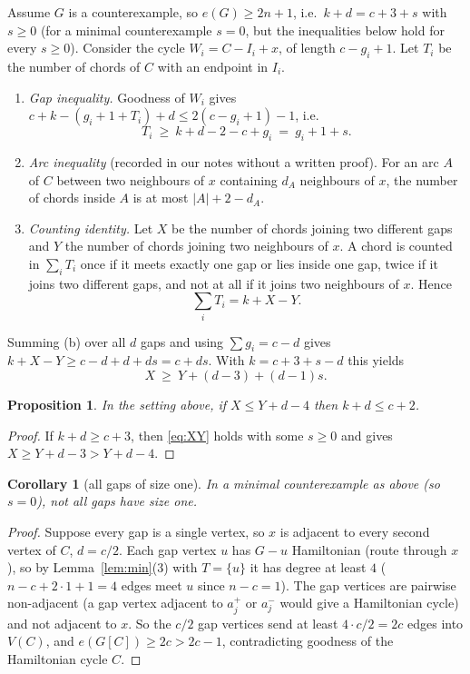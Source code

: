 \documentclass[11pt]{amsart}
\newtheorem{proposition}{Proposition}
\newtheorem{corollary}{Corollary}
\theoremstyle{remark}
\begin{document}
Assume $G$ is a counterexample, so $e(G)\ge 2n+1$, i.e.\ $k+d=c+3+s$ with $s\ge0$ (for a minimal counterexample $s=0$, but the inequalities below hold for every $s\ge0$). Consider the cycle $W_i=C-I_i+x$, of length $c-g_i+1$. Let $T_i$ be the number of chords of $C$ with an endpoint in $I_i$.

\begin{enumerate}
\item[(b)] \emph{Gap inequality.} Goodness of $W_i$ gives $c+k-(g_i+1+T_i)+d\le 2(c-g_i+1)-1$, i.e.
\[
T_i\ \ge\ k+d-2-c+g_i\ =\ g_i+1+s .
\]
\item[(c)] \emph{Arc inequality} (recorded in our notes without a written proof). For an arc $A$ of $C$ between two neighbours of $x$ containing $d_A$ neighbours of $x$, the number of chords inside $A$ is at most $|A|+2-d_A$.
\item[(d)] \emph{Counting identity.} Let $X$ be the number of chords joining two different gaps and $Y$ the number of chords joining two neighbours of $x$. A chord is counted in $\sum_iT_i$ once if it meets exactly one gap or lies inside one gap, twice if it joins two different gaps, and not at all if it joins two neighbours of $x$. Hence
\[
\sum_i T_i=k+X-Y .
\]
\end{enumerate}

Summing (b) over all $d$ gaps and using $\sum g_i=c-d$ gives $k+X-Y\ge c-d+d+ds=c+ds$. With $k=c+3+s-d$ this yields
\begin{equation}\label{eq:XY}
X\ \ge\ Y+(d-3)+(d-1)s .
\end{equation}

\begin{proposition}\label{prop:gaps}
In the setting above, if $X\le Y+d-4$ then $k+d\le c+2$.
\end{proposition}
\begin{proof}
If $k+d\ge c+3$, then \eqref{eq:XY} holds with some $s\ge0$ and gives $X\ge Y+d-3>Y+d-4$.
\end{proof}

\begin{corollary}[all gaps of size one]\label{cor:one}
In a minimal counterexample as above (so $s=0$), not all gaps have size one.
\end{corollary}
\begin{proof}
Suppose every gap is a single vertex, so $x$ is adjacent to every second vertex of $C$, $d=c/2$. Each gap vertex $u$ has $G-u$ Hamiltonian (route through $x$), so by Lemma~\ref{lem:min}(3) with $T=\{u\}$ it has degree at least $4$ ($n-c+2\cdot 1+1=4$ edges meet $u$ since $n-c=1$). The gap vertices are pairwise non-adjacent (a gap vertex adjacent to $a_j^+$ or $a_j^-$ would give a Hamiltonian cycle) and not adjacent to $x$. So the $c/2$ gap vertices send at least $4\cdot c/2=2c$ edges into $V(C)$, and $e(G[C])\ge 2c>2c-1$, contradicting goodness of the Hamiltonian cycle $C$.
\end{proof}
\end{document}
